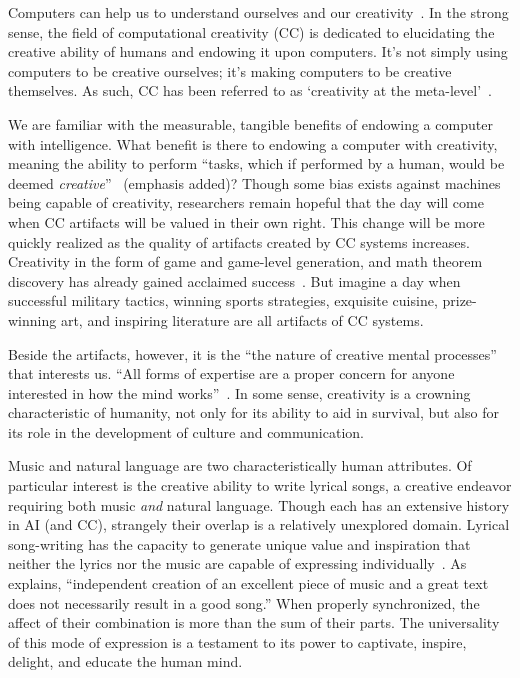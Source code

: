 \documentclass[11pt,phd]{byuprop}
\begin{document}
Computers can help us to understand ourselves and our creativity~\cite{boden2004creative}. In the strong sense, the field of computational creativity (CC) is dedicated to elucidating the creative ability of humans and endowing it upon computers. It's not simply using computers to be creative ourselves; it's making computers to be creative themselves. As such, CC has been referred to as `creativity at the meta-level'~\cite{buchanan2001creativity}.

We are familiar with the measurable, tangible benefits of endowing a computer with intelligence. What benefit is there to endowing a computer with creativity, meaning the ability to perform ``tasks, which if performed by a human, would be deemed \emph{creative}''~\cite{wiggins2006preliminary} (emphasis added)? Though some bias exists against machines being capable of creativity, researchers remain hopeful that the day will come when CC artifacts will be valued in their own right. This change will be more quickly realized as the quality of artifacts created by CC systems increases. Creativity in the form of game and game-level generation, and math theorem discovery has already gained acclaimed success~\cite{colton2012computational}. But imagine a day when successful military tactics, winning sports strategies, exquisite cuisine, prize-winning art, and inspiring literature are all artifacts of CC systems.

Beside the artifacts, however, it is the ``the nature of creative mental processes''~\cite{johnson1991jazz} that interests us. ``All forms of expertise are a proper concern for anyone interested in how the mind works''~\cite{johnson1991jazz}. In some sense, creativity is a crowning characteristic of humanity, not only for its ability to aid in survival, but also for its role in the development of culture and communication.

Music and natural language are two characteristically human attributes. Of particular interest is the creative ability to write lyrical songs, a creative endeavor requiring both music \emph{and} natural language. Though each has an extensive history in AI (and CC), strangely their overlap is a relatively unexplored domain. Lyrical song-writing has the capacity to generate unique value and inspiration that neither the lyrics nor the music are capable of expressing individually~\cite{mihalcea2012lyrics}. As~\cite{toivanen2013automatical} explains, ``independent creation of an excellent piece of music and a great text does not necessarily result in a good song.'' When properly synchronized, the affect of their combination is more than the sum of their parts. The universality of this mode of expression is a testament to its power to captivate, inspire, delight, and educate the human mind.
\end{document}
